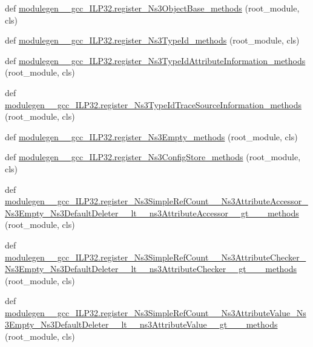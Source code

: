 \begin{DoxyCompactItemize}
\item 
def \hyperlink{namespacemodulegen____gcc__ILP32_ae2b1090e9e01cb32c1979aebbbf2d3d0}{modulegen\+\_\+\+\_\+gcc\+\_\+\+I\+L\+P32.\+register\+\_\+\+Ns3\+Object\+Base\+\_\+methods} (root\+\_\+module, cls)
\item 
def \hyperlink{namespacemodulegen____gcc__ILP32_a6436195ea7813af4a6f5611bac15066d}{modulegen\+\_\+\+\_\+gcc\+\_\+\+I\+L\+P32.\+register\+\_\+\+Ns3\+Type\+Id\+\_\+methods} (root\+\_\+module, cls)
\item 
def \hyperlink{namespacemodulegen____gcc__ILP32_afa4c5c57202d38b0cdfa0d7fd58b5797}{modulegen\+\_\+\+\_\+gcc\+\_\+\+I\+L\+P32.\+register\+\_\+\+Ns3\+Type\+Id\+Attribute\+Information\+\_\+methods} (root\+\_\+module, cls)
\item 
def \hyperlink{namespacemodulegen____gcc__ILP32_a839bc77808351c50cde37c45869c9ac2}{modulegen\+\_\+\+\_\+gcc\+\_\+\+I\+L\+P32.\+register\+\_\+\+Ns3\+Type\+Id\+Trace\+Source\+Information\+\_\+methods} (root\+\_\+module, cls)
\item 
def \hyperlink{namespacemodulegen____gcc__ILP32_aaaf5b4399b80410455abaa6263f1cd29}{modulegen\+\_\+\+\_\+gcc\+\_\+\+I\+L\+P32.\+register\+\_\+\+Ns3\+Empty\+\_\+methods} (root\+\_\+module, cls)
\item 
def \hyperlink{namespacemodulegen____gcc__ILP32_abf4295c2ddccbc3b21712d59654dc065}{modulegen\+\_\+\+\_\+gcc\+\_\+\+I\+L\+P32.\+register\+\_\+\+Ns3\+Config\+Store\+\_\+methods} (root\+\_\+module, cls)
\item 
def \hyperlink{namespacemodulegen____gcc__ILP32_ac3ab36c44430c9b0f0301233bd18935b}{modulegen\+\_\+\+\_\+gcc\+\_\+\+I\+L\+P32.\+register\+\_\+\+Ns3\+Simple\+Ref\+Count\+\_\+\+\_\+\+Ns3\+Attribute\+Accessor\+\_\+\+Ns3\+Empty\+\_\+\+Ns3\+Default\+Deleter\+\_\+\+\_\+lt\+\_\+\+\_\+ns3\+Attribute\+Accessor\+\_\+\+\_\+gt\+\_\+\+\_\+\+\_\+methods} (root\+\_\+module, cls)
\item 
def \hyperlink{namespacemodulegen____gcc__ILP32_a8e35760026d969bed52bf02d5751f184}{modulegen\+\_\+\+\_\+gcc\+\_\+\+I\+L\+P32.\+register\+\_\+\+Ns3\+Simple\+Ref\+Count\+\_\+\+\_\+\+Ns3\+Attribute\+Checker\+\_\+\+Ns3\+Empty\+\_\+\+Ns3\+Default\+Deleter\+\_\+\+\_\+lt\+\_\+\+\_\+ns3\+Attribute\+Checker\+\_\+\+\_\+gt\+\_\+\+\_\+\+\_\+methods} (root\+\_\+module, cls)
\item 
def \hyperlink{namespacemodulegen____gcc__ILP32_ae37f0969d06fd5e11e962c9b2a58d222}{modulegen\+\_\+\+\_\+gcc\+\_\+\+I\+L\+P32.\+register\+\_\+\+Ns3\+Simple\+Ref\+Count\+\_\+\+\_\+\+Ns3\+Attribute\+Value\+\_\+\+Ns3\+Empty\+\_\+\+Ns3\+Default\+Deleter\+\_\+\+\_\+lt\+\_\+\+\_\+ns3\+Attribute\+Value\+\_\+\+\_\+gt\+\_\+\+\_\+\+\_\+methods} (root\+\_\+module, cls)

\end{DoxyCompactItemize}
